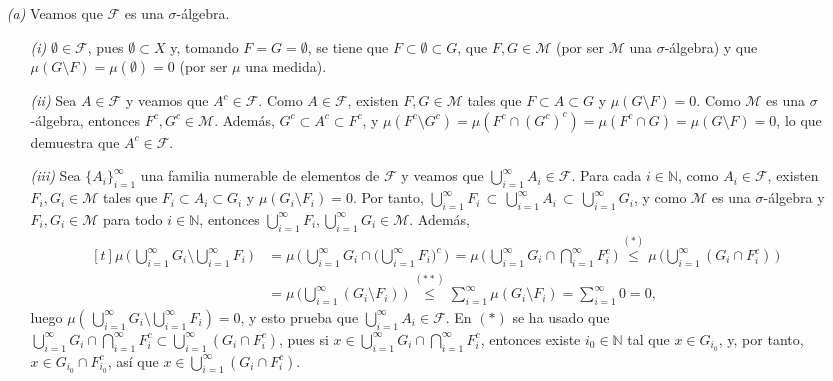 \documentclass[11pt]{report}
\newcommand{\N}{\mathbb N}
\newcommand{\F}{\mathcal F}
\newcommand{\M}{\mathcal M}
\begin{document}
\begin{itemize}
    \item[\textit{(a)}] Veamos que $\F$ es una $\sigma$-álgebra.
    \begin{itemize}
        \item[\textit{(i)}] $\emptyset \in \F$, pues $\emptyset \subset X$ y, tomando $F=G=\emptyset$, se tiene que $F \subset \emptyset \subset G$, que $F,G\in \M$ (por ser $\M$ una $\sigma$-álgebra) y que $\mu(G\setminus F) = \mu(\emptyset)=0$ (por ser $\mu$ una medida).
        \item[\textit{(ii)}] Sea $A \in \F$ y veamos que $A^c \in \F$. Como $A \in \F$, existen $F,G \in \M$ tales que $F \subset A \subset G$ y $\mu(G\setminus F) = 0$. Como $\M$ es una $\sigma$-álgebra, entonces $F^c,G^c \in \M$. Además, $G^c \subset A^c \subset F^c$, y $\mu(F^c \setminus G^c) = \mu (F^c \cap (G^c)^c) = \mu (F^c \cap G) = \mu (G\setminus F) = 0$, lo que demuestra que $A^c \in \F$.
        \item[\textit{(iii)}] Sea $\{A_i\}_{i=1}^\infty$ una familia numerable de elementos de $\F$ y veamos que $\bigcup_{i=1}^\infty A_i \in \F$. Para cada $i \in \N$, como $A_i \in \F$, existen $F_i,G_i \in \M$ tales que $F_i \subset A_i \subset G_i$ y $\mu(G_i \setminus F_i) = 0$. Por tanto, $\bigcup_{i=1}^\infty F_i \, \subset \, \bigcup_{i=1}^\infty A_i \, \subset \, \bigcup_{i=1}^\infty G_i$, y como $\M$ es una $\sigma$-álgebra y $F_i,G_i \in \M$ para todo $i \in \N$, entonces $\bigcup_{i=1}^\infty F_i, \bigcup_{i=1}^\infty G_i \in \M$. Además,
        \[
        \begin{aligned}[t]
        \mu\,\biggl(\,\bigcup_{i=1}^\infty G_i \setminus \bigcup_{i=1}^\infty F_i\,\biggr)\, &= \mu\,\biggl(\,\bigcup_{i=1}^\infty G_i \cap \biggl( \bigcup_{i=1}^\infty F_i\biggr)^c\,\biggr)\, = \mu\,\biggl(\,\bigcup_{i=1}^\infty G_i \cap \bigcap_{i=1}^\infty F_i^c\,\biggr) \overset{(\ast)}{\leq} \mu\,\biggl(\bigcup_{i=1}^\infty (G_i \cap F_i^c)\,\biggr)\, \\
        &= \mu\,\biggl(\bigcup_{i=1}^\infty (G_i \setminus F_i)\,\biggr)\, \overset{(\ast\ast)}{\leq} \sum_{i=1}^\infty\mu(G_i\setminus F_i) = \sum_{i=1}^\infty 0 = 0,
        \end{aligned}
        \]
        luego $\mu(\,\bigcup_{i=1}^\infty G_i \setminus \bigcup_{i=1}^\infty F_i) = 0$, y esto prueba que $\bigcup_{i=1}^\infty A_i \in \F$. En $(\ast)$ se ha usado que $\bigcup_{i=1}^\infty G_i \cap \bigcap_{i=1}^\infty F_i^c \subset \bigcup_{i=1}^\infty (G_i \cap F_i^c)$, pues si $x \in \bigcup_{i=1}^\infty G_i \cap \bigcap_{i=1}^\infty F_i^c$, entonces existe $i_0 \in \N$ tal que $x \in G_{i_0}$, y, por tanto,  $x \in G_{i_0} \cap F_{i_0}^c$, así que $x \in \bigcup_{i=1}^\infty(G_i \cap F_i^c)$.

\end{itemize}
\end{itemize}
\end{document}
